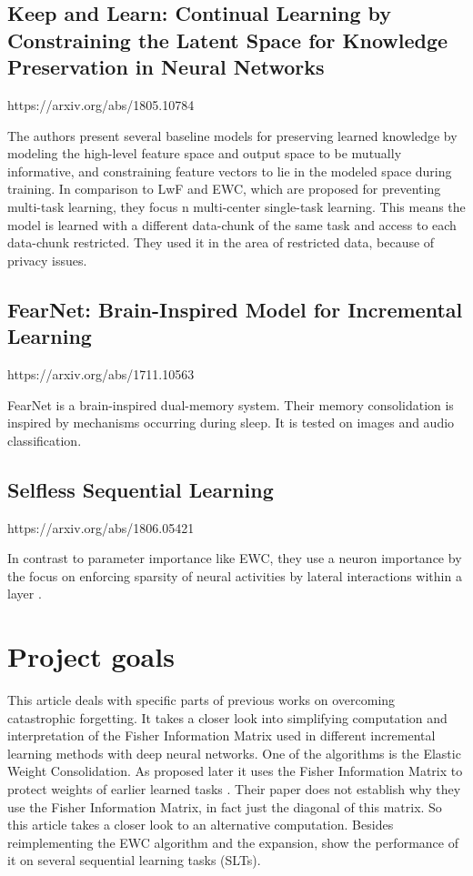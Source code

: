 \subsection*{Keep and Learn: Continual Learning by Constraining the Latent Space for Knowledge Preservation in Neural Networks}
https://arxiv.org/abs/1805.10784

The authors present several baseline models for preserving learned knowledge by modeling the high-level feature space and output space to be mutually informative, and constraining feature vectors to lie in the modeled space during training.
In comparison to LwF and EWC, which are proposed for preventing multi-task learning, they focus n multi-center single-task learning.
This means the model is learned with a different data-chunk of the same task and access to each data-chunk restricted.
They used it in the area of restricted data, because of privacy issues.

\subsection*{FearNet: Brain-Inspired Model for Incremental Learning}
https://arxiv.org/abs/1711.10563

FearNet is a brain-inspired dual-memory system.
Their memory consolidation is inspired by mechanisms occurring during sleep.
It is tested on images and audio classification.

\subsection*{Selfless Sequential Learning}
https://arxiv.org/abs/1806.05421

In contrast to parameter importance like EWC, they use a neuron importance by the focus on enforcing sparsity of neural activities by lateral interactions within a layer \cite{cf_application_oriented_study}.


\section{Project goals}
\label{project_goals}

This article deals with specific parts of previous works on overcoming catastrophic forgetting.
It takes a closer look into simplifying computation and interpretation of the Fisher Information Matrix used in different incremental learning methods with deep neural networks.
One of the algorithms is the Elastic Weight Consolidation.
As proposed later it uses the Fisher Information Matrix to protect weights of earlier learned tasks \cite{elastic-weight-consolidation}.
Their paper does not establish why they use the Fisher Information Matrix, in fact just the diagonal of this matrix.
So this article takes a closer look to an alternative computation.
Besides reimplementing the EWC algorithm and the expansion, show the performance of it on several sequential learning tasks (SLTs).

